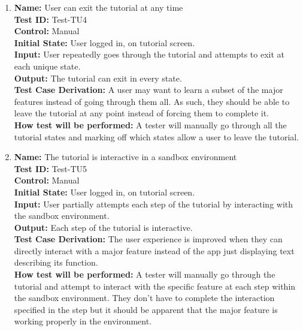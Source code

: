 \documentclass[12pt, titlepage]{article}
\begin{document}
\begin{enumerate}
  \item
        \textbf{Name:} User can exit the tutorial at any time \label{itm:Test-TU4} \\
        \textbf{Test ID:} Test-TU4 \\
        \textbf{Control:} Manual \\
        \textbf{Initial State:} User logged in, on tutorial screen. \\
        \textbf{Input:} User repeatedly goes through the tutorial and attempts to exit at each unique state. \\
        \textbf{Output:} The tutorial can exit in every state. \\
        \textbf{Test Case Derivation:} A user may want to learn a subset of the major features instead of going through them all. As such, they should be able to leave the tutorial at any point instead of forcing them to complete it. \\
        \textbf{How test will be performed:} A tester will manually go through all the tutorial states and marking off which states allow a user to leave the tutorial.

  \item
        \textbf{Name:} The tutorial is interactive in a sandbox environment \label{itm:Test-TU5} \\
        \textbf{Test ID:} Test-TU5 \\
        \textbf{Control:} Manual \\
        \textbf{Initial State:} User logged in, on tutorial screen. \\
        \textbf{Input:} User partially attempts each step of the tutorial by interacting with the sandbox environment. \\
        \textbf{Output:} Each step of the tutorial is interactive. \\
        \textbf{Test Case Derivation:} The user experience is improved when they can directly interact with a major feature instead of the app just displaying text describing its function. \\
        \textbf{How test will be performed:} A tester will manually go through the tutorial and attempt to interact with the specific feature at each step within the sandbox environment. They don't have to complete the interaction specified in the step but it should be apparent that the major feature is working properly in the environment.

\end{enumerate}
\end{document}
